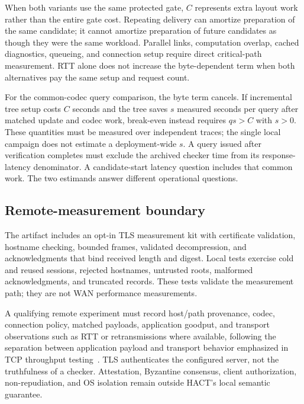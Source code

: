 When both variants use the same protected gate, $C$ represents extra layout work rather than the entire gate cost. Repeating delivery can amortize preparation of the same candidate; it cannot amortize preparation of future candidates as though they were the same workload. Parallel links, computation overlap, cached diagnostics, queueing, and connection setup require direct critical-path measurement. RTT alone does not increase the byte-dependent term when both alternatives pay the same setup and request count.

For the common-codec query comparison, the byte term cancels. If incremental
tree setup costs $C$ seconds and the tree saves $s$ measured seconds per query
after matched update and codec work, break-even instead requires $qs>C$ with
$s>0$. These quantities must be measured over independent traces; the single
local campaign does not estimate a deployment-wide $s$. A query issued after
verification completes must exclude the archived checker time from its
response-latency denominator. A candidate-start latency question includes
that common work. The two estimands answer different operational questions.

\subsection{Remote-measurement boundary}
The artifact includes an opt-in TLS measurement kit with certificate validation, hostname checking, bounded frames, validated decompression, and acknowledgments that bind received length and digest. Local tests exercise cold and reused sessions, rejected hostnames, untrusted roots, malformed acknowledgments, and truncated records. These tests validate the measurement path; they are not WAN performance measurements.

A qualifying remote experiment must record host/path provenance, codec, connection policy, matched payloads, application goodput, and transport observations such as RTT or retransmissions where available, following the separation between application payload and transport behavior emphasized in TCP throughput testing~\cite{rfc6349}. TLS authenticates the configured server, not the truthfulness of a checker. Attestation, Byzantine consensus, client authorization, non-repudiation, and OS isolation remain outside HACT's local semantic guarantee.
